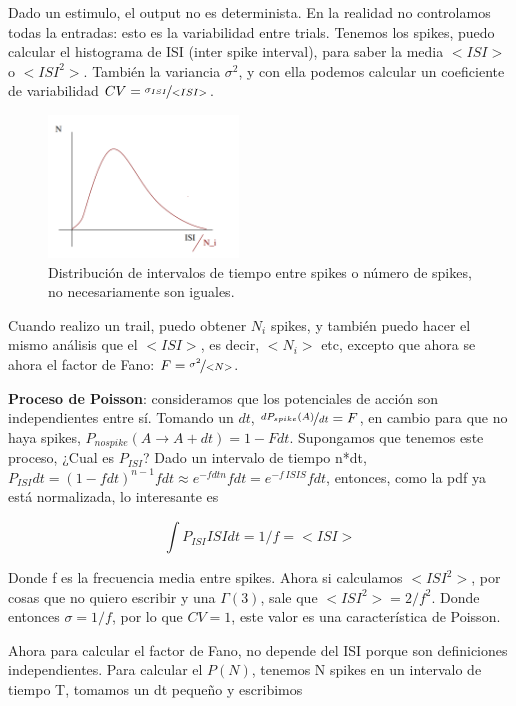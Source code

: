 Dado un estimulo, el output no es determinista. En la realidad no controlamos todas la entradas: esto es la variabilidad entre trials. Tenemos los spikes, puedo calcular el histograma de ISI (inter spike interval), para saber la media $<ISI>$ o $<ISI^2>$. También la variancia $\sigma^2$, y con ella podemos calcular un coeficiente de variabilidad $CV = \nicefrac{\sigma_{ISI}}{<ISI>}$.

\begin{figure}[H]
	\centering
	\includegraphics[width=0.45\textwidth]{2-1.png}
	\caption{Distribución de intervalos de tiempo entre spikes o número de spikes, no necesariamente son iguales.}
\end{figure}

Cuando realizo un trail, puedo obtener $N_i$ spikes, y también puedo hacer el mismo análisis que el $<ISI>$, es decir, $<N_i>$ etc, excepto que ahora se ahora el factor de Fano: $F = \nicefrac{\sigma^2}{<N>}$.


{\bf Proceso de Poisson}: consideramos que los potenciales de acción son independientes entre sí. Tomando un $dt$, $\nicefrac{dP_{spike}(A)}{dt} = F$, en cambio para que no haya spikes, $P_{no spike}(A \rightarrow A+dt) = 1 -F dt$. 
Supongamos que tenemos este proceso, ¿Cual es $P_{ISI}$? Dado un intervalo de tiempo n*dt, $P_{ISI}dt=(1-fdt)^{n-1}fdt \approx e^{-fdtn}fdt = e^{-f\,ISIS}fdt$, entonces, como la pdf ya está normalizada, lo interesante es 

\begin{equation}
	\int P_{ISI} ISI dt = 1/f = <ISI>
\end{equation}

Donde f es la frecuencia media entre spikes.  Ahora si calculamos $<ISI^2>$, por cosas que no quiero escribir y una $\Gamma(3)$, sale que $<ISI^2>= 2/f^2$. Donde entonces $\sigma= 1/f$, por lo que $CV=1$, este valor es una característica de Poisson.


Ahora para calcular el factor de Fano, no depende  del ISI porque son definiciones independientes. Para calcular el $P(N)$, tenemos N spikes en un intervalo de tiempo T, tomamos un dt pequeño y escribimos

